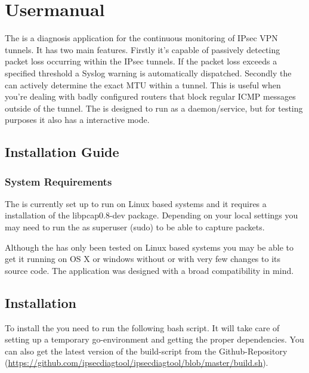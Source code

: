 \chapter{Usermanual}
\label{chap:Usermanual}
The \entool{} is a diagnosis application for the continuous monitoring of \acs{IPsec} \acs{VPN} tunnels. It has two main features. Firstly it's capable of passively detecting packet loss occurring within the \acs{IPsec} tunnels. If the packet loss exceeds a specified threshold a Syslog warning is automatically dispatched. Secondly the \entool{} can actively determine the exact \acs{MTU} within a tunnel. This is useful when you're dealing with badly configured routers that block regular \acs{ICMP} messages outside of the tunnel. The \entool{} is designed to run as a daemon/service, but for testing purposes it also has a interactive mode.

\section{Installation Guide}

\subsection{System Requirements}
The \entool{} is currently set up to run on Linux based systems and it requires a installation of the libpcap0.8-dev package. Depending on your local settings you may need to run the \entool{} as superuser (sudo) to be able to capture packets.

Although the \entool{} has only been tested on Linux based systems you may be able to get it running on OS X or windows without or with very few changes to its source code. The application was designed with a broad compatibility in mind.
\cleardoublepage

\section{Installation}
To install the \entool{} you need to run the following bash script. It will take care of setting up a temporary go-environment and getting the proper dependencies. You can also get the latest version of the build-script from the Github-Repository (\url{https://github.com/ipsecdiagtool/ipsecdiagtool/blob/master/build.sh}).

